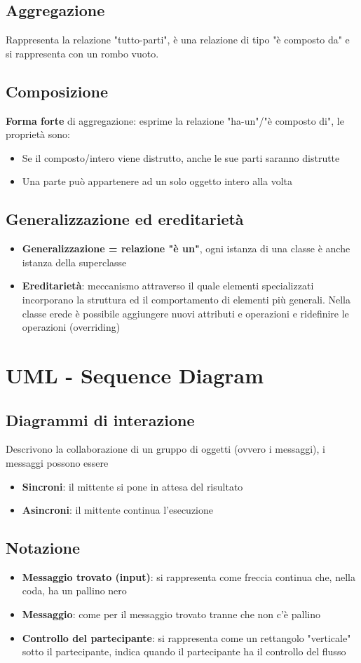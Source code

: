 \documentclass[12pt, a4paper]{report}
\begin{document}
\section{Aggregazione}
Rappresenta la relazione "tutto-parti", è una relazione di tipo "è composto da" e si rappresenta con un rombo vuoto.
\section{Composizione}
\textbf{Forma forte} di aggregazione: esprime la relazione "ha-un"/"è composto di", le proprietà sono:
\begin{itemize}
    \item Se il composto/intero viene distrutto, anche le sue parti saranno distrutte
    \item Una parte può appartenere ad un solo oggetto intero alla volta
\end{itemize}
\section{Generalizzazione ed ereditarietà}
\begin{itemize}
    \item \textbf{Generalizzazione = relazione "è un"}, ogni istanza di una classe è anche istanza della superclasse
    \item \textbf{Ereditarietà}: meccanismo attraverso il quale elementi specializzati incorporano la struttura ed il comportamento di elementi più generali. Nella classe erede è possibile aggiungere nuovi attributi e operazioni e ridefinire le operazioni (overriding)
\end{itemize}
\chapter{UML - Sequence Diagram}
\section{Diagrammi di interazione}
Descrivono la collaborazione di un gruppo di oggetti (ovvero i messaggi), i messaggi possono essere 
\begin{itemize}
    \item \textbf{Sincroni}: il mittente si pone in attesa del risultato
    \item \textbf{Asincroni}: il mittente continua l'esecuzione
\end{itemize}
\section{Notazione}
\begin{itemize}
    \item \textbf{Messaggio trovato (input)}: si rappresenta come freccia continua che, nella coda, ha un pallino nero
    \item \textbf{Messaggio}: come per il messaggio trovato tranne che non c'è pallino
    \item \textbf{Controllo del partecipante}: si rappresenta come un rettangolo "verticale" sotto il partecipante, indica quando il partecipante ha il controllo del flusso
\end{itemize}
\end{document}
